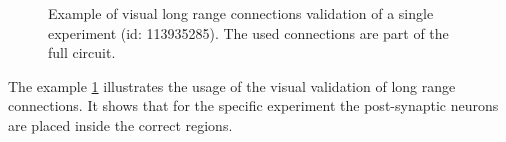 \begin{figure}[ht!]
\begin{center}
{       }
       \hspace{0.2cm}
    \end{center}
    	\caption{%
        Example of visual long range connections validation of a single experiment (id: 113935285).
        The used connections are part of the full circuit.
     }%
   \label{fig:longrangevalidation}
   \end{figure}
   
The example \ref{fig:longrangevalidation} illustrates the usage of the visual validation of long range connections.
It shows that for the specific experiment the post-synaptic neurons are placed inside the correct regions.

